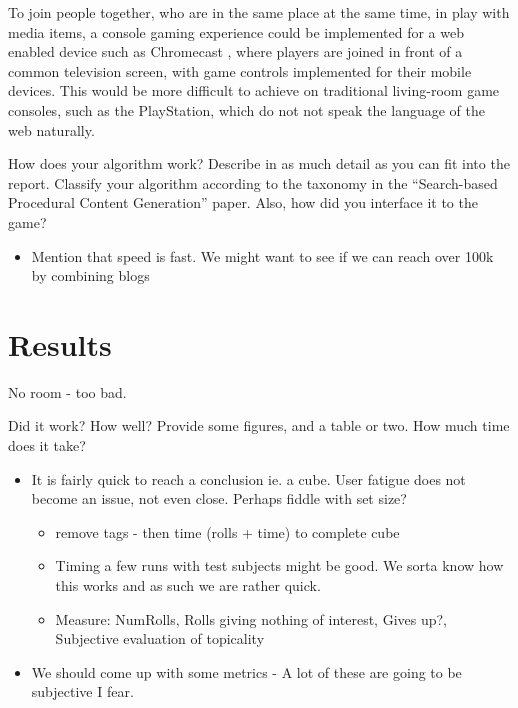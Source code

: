 \documentclass[]{article}
\begin{document}
To join people together, who are in the same place at the same time, in play with media items, a console gaming experience could be implemented for a web enabled device such as Chromecast \cite{ChromecastGames}, where players are joined in front of a common television screen, with game controls implemented for their mobile devices.  This would be more difficult to achieve on traditional living-room game consoles, such as the PlayStation, which do not not speak the language of the web naturally.



\begin{framed}
How does your algorithm work? Describe in as much detail as you can fit into the report. Classify your algorithm according to the taxonomy in the “Search-based Procedural Content Generation” paper. Also, how did you interface it to the game?
\end{framed}



\begin{itemize}
\item Mention that speed is fast. We might want to see if we can reach over 100k by combining blogs
\end{itemize}


\section{Results}
\label{sec:Results}
No room - too bad.
\begin{framed}
Did it work? How well? Provide some figures, and a table or two. How much time does it take?
\end{framed}
\begin{itemize}		
\item It is fairly quick to reach a conclusion ie. a cube. User fatigue does not become an issue, not even close. Perhaps fiddle with set size?
	\begin{itemize}
	\item remove tags - then time (rolls + time) to complete cube
	\item Timing a few runs with test subjects might be good. We sorta know how this works and as such we are rather quick.
	\item Measure: NumRolls, Rolls giving nothing of interest, Gives up?, Subjective evaluation of topicality
	\end{itemize}
\item We should come up with some metrics - A lot of these are going to be subjective I fear.
\end{itemize}
\end{document}
